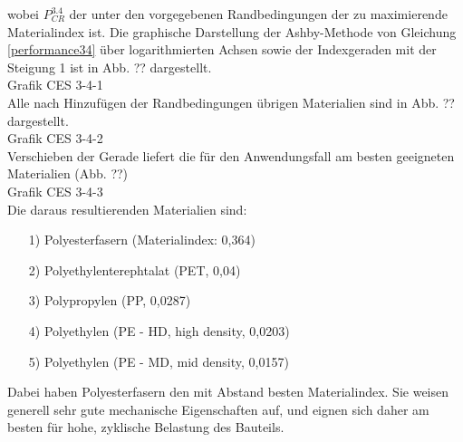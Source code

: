 wobei $P_{CR}^{3.4}$ der unter den vorgegebenen Randbedingungen der zu maximierende Materialindex ist. Die graphische Darstellung der Ashby-Methode von Gleichung \ref{performance34} über logarithmierten Achsen sowie der Indexgeraden mit der Steigung 1 ist in Abb. ?? dargestellt.\\
Grafik CES 3-4-1\\
Alle nach Hinzufügen der Randbedingungen übrigen Materialien sind in Abb. ?? dargestellt.\\
Grafik CES 3-4-2\\
Verschieben der Gerade liefert die für den Anwendungsfall am besten geeigneten Materialien (Abb. ??)\\
Grafik CES 3-4-3\\
Die daraus resultierenden Materialien sind:
\begin{itemize}
	\item[1)] Polyesterfasern (Materialindex: 0,364)
	\item[2)] Polyethylenterephtalat (PET, 0,04) 
	\item[3)] Polypropylen (PP, 0,0287)
	\item[4)] Polyethylen (PE - HD, high density, 0,0203)
	\item[5)] Polyethylen (PE - MD, mid density, 0,0157)
\end{itemize}
Dabei haben Polyesterfasern den mit Abstand besten Materialindex. Sie weisen generell sehr gute mechanische Eigenschaften auf, und eignen sich daher am besten für hohe, zyklische Belastung des Bauteils.
